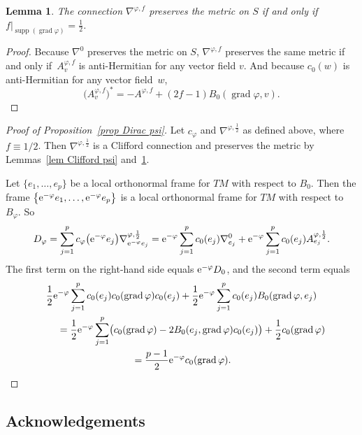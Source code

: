 \documentclass[10pt,a4paper]{amsart}
\numberwithin{equation}{section}
\newtheorem{Lemma}[Theorem]{Lemma}
\DeclareMathOperator{\grad}{grad}
\DeclareMathOperator{\supp}{supp}
\begin{document}
\begin{Lemma}\label{lem pres metric}
The connection $\nabla^{\varphi,f}$ preserves the metric on $S$ if and only if $f|_{\supp(\grad \varphi)} = \frac{1}{2}$.
\end{Lemma}
\begin{proof}
Because $\nabla^0$ preserves the metric on $S$, $\nabla^{\varphi,f}$ preserves the same metric if and only if~$A^{\varphi,f}_v$ is anti-Hermitian for any vector field $v$. And because $c_0(w)$ is anti-Hermitian for any vector field~$w$,
\begin{equation*}
\big(A^{\varphi,f}_v\big)^* = -A^{\varphi,f} + (2f-1)B_0(\grad \varphi, v).\tag*{\qed}
\end{equation*}
\renewcommand{\qed}{}
\end{proof}

\begin{proof}[Proof of Proposition~\ref{prop Dirac psi}]
Let $c_{\varphi}$ and $\nabla^{\varphi, \frac{1}{2}}$ as defined above, where $f \equiv 1/2$. Then $\nabla^{\varphi, \frac{1}{2}}$ is a Clifford connection and preserves the metric by Lemmas~\ref{lem Clifford psi} and~\ref{lem pres metric}.

Let $\{e_1, \dots, e_p\}$ be a local orthonormal frame for $TM$ with respect to $B_0$. Then the frame $\big\{{\rm e}^{-\varphi} e_1, \dots, {\rm e}^{-\varphi} e_p\big\}$ is a local orthonormal frame for $TM$ with respect to $B_{\varphi}$. So
\[
D_{\varphi} = \sum_{j=1}^p c_{\varphi}\big({\rm e}^{-\varphi}e_j\big) \nabla^{\varphi, \frac{1}{2}}_{{\rm e}^{-\varphi} e_j}
= {\rm e}^{-\varphi} \sum_{j=1}^p c_0(e_j) \nabla^0_{e_j}
+{\rm e}^{-\varphi} \sum_{j=1}^p c_0(e_j) A^{\varphi, \frac{1}{2}}_{e_j}.
\]
The first term on the right-hand side equals ${\rm e}^{-\varphi} D_0$, and the second term equals
\begin{gather*}
\frac{1}{2}{\rm e}^{-\varphi} \sum_{j=1}^p c_0(e_j) c_0(\grad \varphi) c_0(e_j)
+\frac{1}{2}{\rm e}^{-\varphi} \sum_{j=1}^p c_0(e_j) B_0(\grad \varphi,e_j)\\
 \qquad{} =
\frac{1}{2}{\rm e}^{-\varphi} \sum_{j=1}^p\bigl( c_0(\grad \varphi) -2 B_0(e_j, \grad \varphi)c_0(e_j)\bigr) + \frac{1}{2} c_0(\grad \varphi)\\
\qquad{}
=\frac{p-1}{2}{\rm e}^{-\varphi} c_0(\grad \varphi). \tag*{\qed}
\end{gather*}
\renewcommand{\qed}{}
\end{proof}

\subsection*{Acknowledgements}
\end{document}

